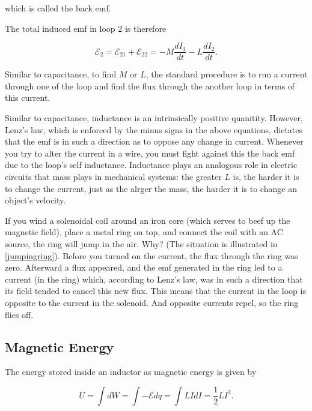 \documentclass[english,a4paper,12pt]{report}
\begin{document}
which is called the back emf.

The total induced emf in loop 2 is therefore

\begin{equation}
    \mathcal{E}_{2}   = \mathcal{E} _{21} + \mathcal{E}_{22} =  -M\frac{dI_1 }{dt}  - L \frac{dI_2 }{dt}.
\end{equation}

Similar to capacitance, to find \(M \text { or } L\), the standard procedure is to run a current through one of the loop and find the flux through the another loop in terms of this current. 

Similar to capacitance, inductance is an intrinsically positive quanitity. However, Lenz's law, which is enforced by the minus signs in the above equations, dictates that the emf is in such a direction as to oppose any change in current. Whenever you try to alter the current in a wire, you must fight against this the back emf due to the loop's self inductance. Inductance plays an analogous role in electric circuits that mass plays in mechanical systems: the greater \(L\) is, the harder it is to change the current, just as the alrger the mass, the harder it is to change an object's velocity.

{If you wind a solenoidal coil around an iron core (which serves to beef up the magnetic field), place a metal ring on top, and connect the coil with an AC source, the ring will jump in the air. Why? (The situation is illustrated in \cref{jumpingring}).}
{Before you turned on the current, the flux through the ring was zero. Afterward a flux appeared, and the emf generated in the ring led to a current (in the ring) which, according to Lenz’s law, was in such a direction that its field tended to cancel this new flux. This means that the current in the loop is opposite to the current in the solenoid. And opposite currents repel, so the ring flies off.} 

\subsection{Magnetic Energy}

The energy stored inside an inductor as magnetic energy is given by 

\begin{equation}
    U = \int dW = \int -\mathcal{E}dq = \int LIdI = \frac{1}{2}LI^2. 
\end{equation}
\end{document}
